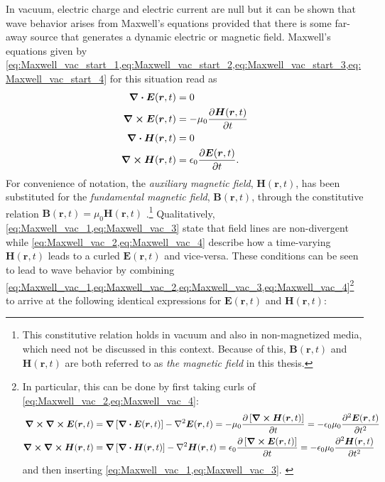 In vacuum, electric charge and electric current are null but it can be shown that wave behavior arises from Maxwell's equations provided that there is some far-away source that generates a dynamic electric or magnetic field. 
Maxwell's equations given by \cref{eq:Maxwell_vac_start_1,eq:Maxwell_vac_start_2,eq:Maxwell_vac_start_3,eq:Maxwell_vac_start_4} for this situation read as
\begin{subequations}
\begin{align}
 \div \mathbold{E}(\mathbold{r},t) &= 0 \label{eq:Maxwell_vac_1}  \\
 \curl \mathbold{E}(\mathbold{r},t) &= - \mu_0 \pdv{\mathbold{H}(\mathbold{r},t)}{t}  \label{eq:Maxwell_vac_2} \\
 \div \mathbold{H}(\mathbold{r},t) &= 0 \label{eq:Maxwell_vac_3}  \\
 \curl \mathbold{H}(\mathbold{r},t) &= \epsilon_0 \pdv{\mathbold{E}(\mathbold{r},t)}{t} . \label{eq:Maxwell_vac_4}
 \end{align}
\end{subequations}
For convenience of notation, the \emph{auxiliary magnetic field}, $\mathbold{H}(\mathbold{r},t)$, has been substituted for the \emph{fundamental magnetic field}, $\mathbold{B}(\mathbold{r},t)$, through the constitutive relation $\mathbold{B}(\mathbold{r},t) = \mu_0 \mathbold{H}(\mathbold{r},t)$ \cite{Landau60,Jackson75,Griffiths17}.\footnote{This constitutive relation holds in vacuum and also in non-magnetized media, which need not be discussed in this context. Because of this, $\mathbold{B}(\mathbold{r},t)$ and $\mathbold{H}(\mathbold{r},t)$ are both referred to as \emph{the magnetic field} in this thesis.} 
Qualitatively, \cref{eq:Maxwell_vac_1,eq:Maxwell_vac_3} state that field lines are non-divergent while \cref{eq:Maxwell_vac_2,eq:Maxwell_vac_4} describe how a time-varying $\mathbold{H}(\mathbold{r},t)$ leads to a curled $\mathbold{E}(\mathbold{r},t)$ and vice-versa. 
These conditions can be seen to lead to wave behavior by combining \cref{eq:Maxwell_vac_1,eq:Maxwell_vac_2,eq:Maxwell_vac_3,eq:Maxwell_vac_4}\footnote{In particular, this can be done by first taking curls of \cref{eq:Maxwell_vac_2,eq:Maxwell_vac_4}: 
\begin{align*}
 \begin{split}
 \curl \curl \mathbold{E}(\mathbold{r},t) &= \grad \left[\div \mathbold{E}(\mathbold{r},t)\right] - \laplacian \mathbold{E}(\mathbold{r},t) = - \mu_0 \pdv{\left[ \curl \mathbold{H} (\mathbold{r},t) \right]}{t} = - \epsilon_0 \mu_0 \pdv[2]{\mathbold{E}(\mathbold{r},t)}{t}\\
 \curl \curl \mathbold{H}(\mathbold{r},t) &= \grad \left[\divergence \mathbold{H}(\mathbold{r},t)\right] - \laplacian \mathbold{H}(\mathbold{r},t) = \epsilon_0 \pdv{\left[ \curl \mathbold{E} (\mathbold{r},t) \right]}{t} = - \epsilon_0 \mu_0 \pdv[2]{\mathbold{H}(\mathbold{r},t)}{t}
 \end{split}
 \end{align*}
and then inserting \cref{eq:Maxwell_vac_1,eq:Maxwell_vac_3}. 
 \label{footnote:combine}} to arrive at the following identical expressions for $\mathbold{E}(\mathbold{r},t)$ and $\mathbold{H}(\mathbold{r},t)$:
